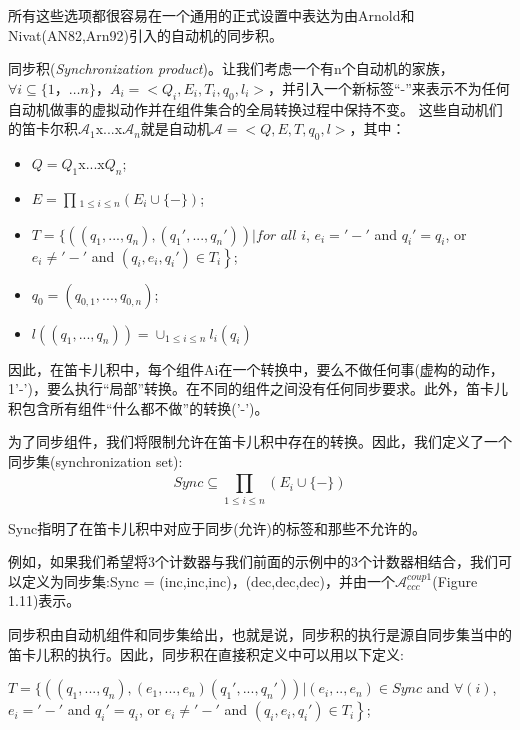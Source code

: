\documentclass{book}
\begin{document}
    所有这些选项都很容易在一个通用的正式设置中表达为由Arnold和Nivat(AN82,Arn92)引入的自动机的同步积。
    
    同步积({\itshape Synchronization product})。让我们考虑一个有n个自动机的家族，$\forall{i}\subseteq\{ 1，…n\}$，$ A_i=<Q_i, E_i, T_i, q_0, l_i>$，并引入一个新标签“-”来表示不为任何自动机做事的虚拟动作并在组件集合的全局转换过程中保持不变。
    这些自动机们的笛卡尔积$\mathcal{A}_1$x...x$\mathcal{A}_n$就是自动机$\mathcal{A} =<Q,E,T,q_0,l>$，其中：
    \begin{itemize}
      \item $Q=Q_1$x...x$Q_n$;
      \item $E=\prod_{}{}_{1\leq i \leq n}(E_i\cup\{-\})$;
      \item $T=\left.\{ ((q_1,...,q_n),(q_1',...,q_n')) |  for\right.$ $all$ $i$, $e_i='-'$ and $q_i'=q_i$, or $e_i\neq '-'$ and $(q_i,e_i,q_i')\in T_i \left.\right\} $;
      \item $q_0=(q_{0,1},...,q_{0,n})$;
      \item $l((q_1,...,q_n))=\cup _{1\leq i \leq n}l_i(q_i)$
    \end{itemize}

    因此，在笛卡儿积中，每个组件Ai在一个转换中，要么不做任何事(虚构的动作，1'-')，要么执行“局部”转换。在不同的组件之间没有任何同步要求。此外，笛卡儿积包含所有组件“什么都不做”的转换('-')。
    
    为了同步组件，我们将限制允许在笛卡儿积中存在的转换。因此，我们定义了一个同步集(synchronization set):
    \begin{equation*}
      Sync \subseteq \prod_{1\leq i \leq n}^{}(E_i\cup\{-\})
    \end{equation*}

    Sync指明了在笛卡儿积中对应于同步(允许)的标签和那些不允许的。
    
    例如，如果我们希望将3个计数器与我们前面的示例中的3个计数器相结合，我们可以定义为同步集:Sync = {(inc,inc,inc)，(dec,dec,dec)}，并由一个$\mathcal{A}_{ccc}^{coup1}$(Figure 1.11)表示。
    
    
    


    同步积由自动机组件和同步集给出，也就是说，同步积的执行是源自同步集当中的笛卡儿积的执行。因此，同步积在直接积定义中可以用以下定义:
    
    $T=\left.\{ ((q_1,...,q_n),(e_1,...,e_n)(q_1',...,q_n')) | (e_i,..,e_n)\in Sync \right.$ and $\forall(i)$, $e_i='-'$ and $q_i'=q_i$, or $e_i\neq '-'$ and $(q_i,e_i,q_i')\in T_i \left.\right\} $;
\end{document}
